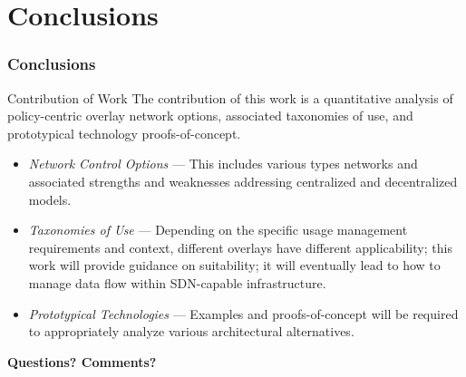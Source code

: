 \section{Conclusions}

\begin{frame}
\frametitle{Conclusions}
\begin{beamerboxesrounded}[shadow]{Contribution of Work}
The contribution of this work is a quantitative analysis of policy-centric overlay network options, associated taxonomies of use, and prototypical technology proofs-of-concept.
\end{beamerboxesrounded}
\begin{itemize}
\item \textit{Network Control Options} --- This includes various types networks and associated strengths and weaknesses addressing centralized and decentralized models.
\item \textit{Taxonomies of Use} --- Depending on the specific usage management requirements and context, different overlays have different applicability; this work will provide guidance on suitability; it will eventually lead to how to manage data flow within SDN-capable infrastructure.
\item \textit{Prototypical Technologies} --- Examples and proofs-of-concept will be required to appropriately analyze various architectural alternatives.
\end{itemize}
\end{frame}

\begin{frame}[c]
\begin{center}
\textbf{Questions? Comments?}
\end{center}
\end{frame}